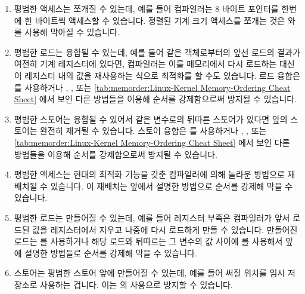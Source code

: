 \begin{enumerate}
\item	평범한 액세스는 쪼개질 수 있는데, 예를 들어 컴파일러는 8 바이트
	포인터를 한번에 한 바이트씩 액세스할 수 있습니다.
	정렬된 기계 크기 액세스를 쪼개는 것은  와
	 를 사용해 막아질 수 있습니다.
\item	평범한 로드는 융합될 수 있는데, 예를 들어 같은 객체로부터의 앞선 로드의
	결과가 여전히 기계 레지스터에 있다면, 컴파일러는 이를 메모리에서 다시
	로드하는 대신 이 레지스터 내의 값을 재사용하는 식으로 최적화를 할 수도
	있습니다.
	로드 융합은  를 사용하거나 ,
	, 또는
	\cref{tab:memorder:Linux-Kernel Memory-Ordering Cheat Sheet}
	에서 보인 다른 방법들을 이용해 순서를 강제함으로써 방지될 수 있습니다.
\item	평범한 스토어는 융합될 수 있어서 같은 변수로의 뒤따른 스토어가 있다면
	앞의 스토어는 완전히 제거될 수 있습니다.
	스토어 융합은  를 사용하거나 ,
	, 또는
	\cref{tab:memorder:Linux-Kernel Memory-Ordering Cheat Sheet}
	에서 보인 다른 방법들을 이용해 순서를 강제함으로써 방지될 수 있습니다.

\item	평범한 액세스는 현대의 최적화 기능을 갖춘 컴파일러에 의해 놀라운
	방법으로 재배치될 수 있습니다.
	이 재배치는 앞에서 설명한 방법으로 순서를 강제해 막을 수 있습니다.
\item	평범한 로드는 만들어질 수 있는데, 예를 들어 레지스터 부족은 컴파일러가
	앞서 로드된 값을 레지스터에서 지우고 나중에 다시 로드하게 만들 수
	있습니다.
	만들어진 로드는  를 사용하거나 해당 로드와 뒤따르는 그
	변수의 값 사이에  를 사용해서 앞에 설명한 방법들로 순서를
	강제해 막을 수 있습니다.
\item	스토어는 평범한 스토어 앞에 만들어질 수 있는데, 예를 들어 써질 위치를
	임시 저장소로 사용하는 겁니다.
	이는  의 사용으로 방지할 수 있습니다.


\end{enumerate}
